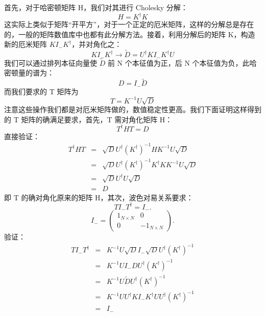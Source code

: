 \documentclass[UTF8]{ctexart}
\begin{document}
首先，对于哈密顿矩阵 H，我们对其进行 Cholesky 分解：
\begin{equation}
H=K^{\dagger}K
\end{equation}
这实际上类似于矩阵“开平方”，对于一个正定的厄米矩阵，这样的分解总是存在的，一般的矩阵数值库中也都有此分解方法。接着，利用分解后的矩阵
K，构造新的厄米矩阵 $KI_{-}K^{\dagger}$，并对角化之：
\begin{equation}
KI_{-}K^{\dagger}\rightarrow\tilde{D}=U^{\dagger}KI_{-}K^{\dagger}U
\end{equation}
我们可以通过排列本征向量使 $\tilde{D}$ 前 N 个本征值为正，后 N 个本征值为负，此哈密顿量的谱为：
\begin{equation}
D=I_{-}\tilde{D}
\end{equation}
而我们要求的 T 矩阵为
\begin{equation}
T=K^{-1}U\sqrt{D}
\end{equation}
注意这些操作我们都是对厄米矩阵做的，数值稳定性更高。我们下面证明这样得到的 T 矩阵的确满足要求，首先，T 需对角化矩阵 H：
\begin{equation}
T^{\dagger}HT=D
\end{equation}
直接验证：
\begin{eqnarray}
T^{\dagger}HT & = & \sqrt{D}U^{\dagger}\left(K^{\dagger}\right)^{-1}HK^{-1}U\sqrt{D}\nonumber \\
 & = & \sqrt{D}U^{\dagger}\left(K^{\dagger}\right)^{-1}K^{\dagger}KK^{-1}U\sqrt{D}\nonumber \\
 & = & \sqrt{D}U^{\dagger}U\sqrt{D}\nonumber \\
 & = & D
\end{eqnarray}
即 T 的确对角化原来的矩阵 H，其次，波色对易关系要求：
\begin{equation}
TI_{-}T^{\dagger}=I_{-}.
\end{equation}
\begin{equation}
I_{-}=\left(\begin{array}{cc}
1_{N\times N} & 0\\
0 & -1_{N\times N}
\end{array}\right).
\end{equation}
验证：
\begin{eqnarray}
TI_{-}T^{\dagger} & = & K^{-1}U\sqrt{D}I_{-}\sqrt{D}U^{\dagger}\left(K^{\dagger}\right)^{-1}\nonumber \\
 & = & K^{-1}UI_{-}DU^{\dagger}\left(K^{\dagger}\right)^{-1}\nonumber \\
 & = & K^{-1}U\tilde{D}U^{\dagger}\left(K^{\dagger}\right)^{-1}\nonumber \\
 & = & K^{-1}UU^{\dagger}KI_{-}K^{\dagger}UU^{\dagger}\left(K^{\dagger}\right)^{-1}\nonumber \\
 & = & I_{-}
\end{eqnarray}
\end{document}

